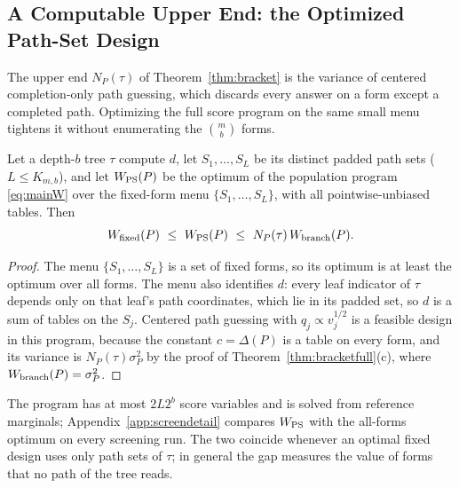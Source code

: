 \subsection{A Computable Upper End: the Optimized Path-Set Design}\label{app:upper}
The upper end $N_P(\tau)$ of Theorem~\ref{thm:bracket} is the variance of centered completion-only path guessing, which discards every answer on a form except a completed path. Optimizing the full score program on the same small menu tightens it without enumerating the $\binom mb$ forms.

\begin{proposition}\label{prop:upper}
Let a depth-$b$ tree $\tau$ compute $d$, let $S_1,\ldots,S_L$ be its distinct padded path sets ($L\le K_{m,b}$), and let $W_{\rm PS}(P)$ be the optimum of the population program \eqref{eq:mainW} over the fixed-form menu $\{S_1,\ldots,S_L\}$, with all pointwise-unbiased tables. Then
\[
 W_{\rm fixed}(P)\ \le\ W_{\rm PS}(P)\ \le\ N_P(\tau)\,W_{\rm branch}(P).
\]
\end{proposition}
\begin{proof}
The menu $\{S_1,\ldots,S_L\}$ is a set of fixed forms, so its optimum is at least the optimum over all forms. The menu also identifies $d$: every leaf indicator of $\tau$ depends only on that leaf's path coordinates, which lie in its padded set, so $d$ is a sum of tables on the $S_j$. Centered path guessing with $q_j\propto v_j^{1/2}$ is a feasible design in this program, because the constant $c=\Delta(P)$ is a table on every form, and its variance is $N_P(\tau)\sigma_P^2$ by the proof of Theorem~\ref{thm:bracketfull}(c), where $W_{\rm branch}(P)=\sigma_P^2$.
\end{proof}
The program has at most $2L2^b$ score variables and is solved from reference marginals; Appendix~\ref{app:screendetail} compares $W_{\rm PS}$ with the all-forms optimum on every screening run. The two coincide whenever an optimal fixed design uses only path sets of $\tau$; in general the gap measures the value of forms that no path of the tree reads.
